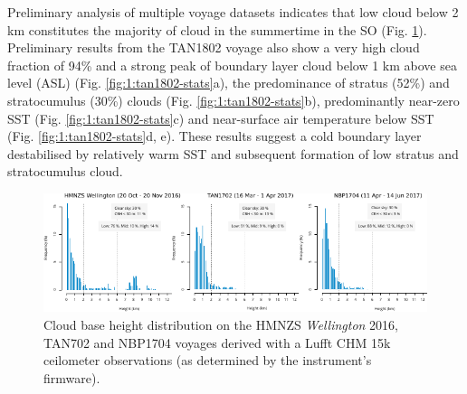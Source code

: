 Preliminary analysis of multiple voyage datasets indicates that low cloud
below 2 km constitutes the majority of cloud in the summertime in the SO
(Fig. \ref{fig:1:cbh}). Preliminary results from the TAN1802 voyage also
show a very high cloud fraction of 94\% and a strong peak of boundary layer
cloud below 1 km above sea level (ASL) (Fig. \ref{fig:1:tan1802-stats}a), the predominance
of stratus (52\%) and stratocumulus (30\%) clouds (Fig. \ref{fig:1:tan1802-stats}b), predominantly
near-zero SST (Fig. \ref{fig:1:tan1802-stats}c) and near-surface air temperature below SST
(Fig. \ref{fig:1:tan1802-stats}d, e). These results suggest a cold boundary layer
destabilised by relatively warm SST and subsequent formation of
low stratus and stratocumulus cloud.

\begin{figure}[t]
\includegraphics[width=\textwidth]{fig/cbh.pdf}
\caption[Cloud base height distribution]{
Cloud base height distribution on the HMNZS \textit{Wellington} 2016, TAN702 and NBP1704
voyages derived with a Lufft CHM 15k ceilometer observations (as determined by
the instrument's firmware).
}
\label{fig:1:cbh}
\end{figure}

